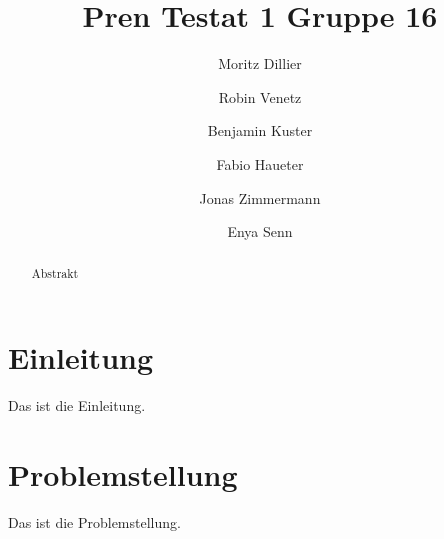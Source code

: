 \documentclass{article}
\title{Pren Testat 1 Gruppe 16}
\author{Moritz Dillier \and Robin Venetz \and Benjamin Kuster \and Fabio Haueter \and Jonas Zimmermann \and Enya Senn}
\date{\thedate}
\begin{document}
\maketitle

\tableofcontents 

\begin{abstract}
Abstrakt
\end{abstract}

\section{Einleitung}
Das ist die Einleitung.
\section{Problemstellung}
Das ist die Problemstellung.
\end{document}
